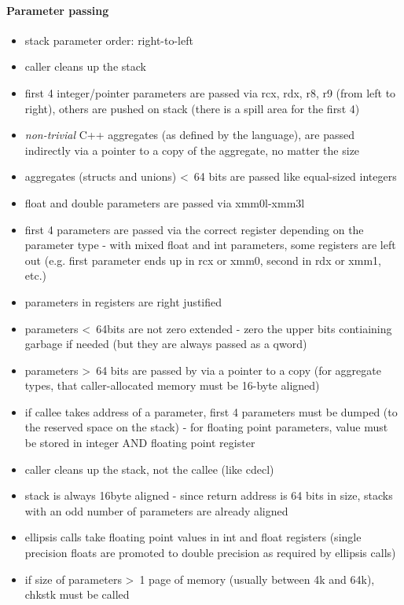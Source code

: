 \paragraph{Parameter passing}

\begin{itemize}
\item stack parameter order: right-to-left
\item caller cleans up the stack
\item first 4 integer/pointer parameters are passed via rcx, rdx, r8, r9 (from left to right), others are pushed on stack (there is a
spill area for the first 4)
\item {\it non-trivial} C++ aggregates (as defined by the language), are passed indirectly via a pointer to a copy of the aggregate, no matter the size
\item aggregates (structs and unions) \textless\ 64 bits are passed like equal-sized integers
\item float and double parameters are passed via xmm0l-xmm3l
\item first 4 parameters are passed via the correct register depending on the parameter type - with mixed float and int parameters,
some registers are left out (e.g. first parameter ends up in rcx or xmm0, second in rdx or xmm1, etc.)
\item parameters in registers are right justified
\item parameters \textless\ 64bits are not zero extended - zero the upper bits contiaining garbage if needed (but they are always
passed as a qword)
\item parameters \textgreater\ 64 bits are passed by via a pointer to a copy (for aggregate types, that caller-allocated memory must be 16-byte aligned)
\item if callee takes address of a parameter, first 4 parameters must be dumped (to the reserved space on the stack) - for
floating point parameters, value must be stored in integer AND floating point register
\item caller cleans up the stack, not the callee (like cdecl)
\item stack is always 16byte aligned - since return address is 64 bits in size, stacks with an odd number of parameters are
already aligned
\item ellipsis calls take floating point values in int and float registers (single precision floats are promoted to double precision as
required by ellipsis calls)
\item if size of parameters \textgreater\ 1 page of memory (usually between 4k and 64k), chkstk must be called
\end{itemize}


